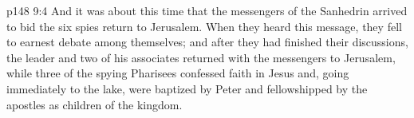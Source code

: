 \vs p148 9:4 \pc And it was about this time that the messengers of the Sanhedrin arrived to bid the six spies return to Jerusalem. When they heard this message, they fell to earnest debate among themselves; and after they had finished their discussions, the leader and two of his associates returned with the messengers to Jerusalem, while three of the spying Pharisees confessed faith in Jesus and, going immediately to the lake, were baptized by Peter and fellowshipped by the apostles as children of the kingdom.
\quizlink
